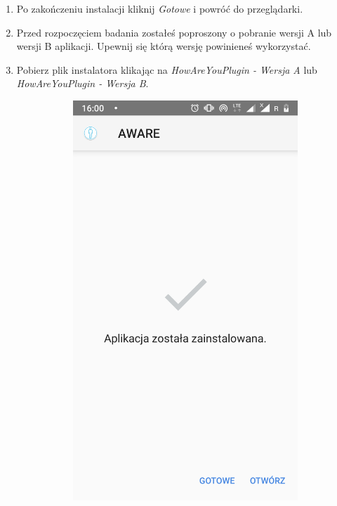\begin{enumerate}
	\item Po zakończeniu instalacji kliknij \textit{Gotowe} i powróć do przeglądarki.
	
	\item Przed rozpoczęciem badania zostałeś poproszony o pobranie wersji A lub wersji B aplikacji. Upewnij się którą wersję powinieneś wykorzystać.
	
	\item Pobierz plik instalatora klikając na \textit{HowAreYouPlugin - Wersja A} lub \textit{HowAreYouPlugin - Wersja B}.
	
	\begin{figure}[H]
		\centering
		\begin{subfigure}{0.35\textwidth}
			\centering
			\includegraphics[scale=0.14]{dodatekA/2_5.png}

\end{subfigure}
\end{figure}
\end{enumerate}
